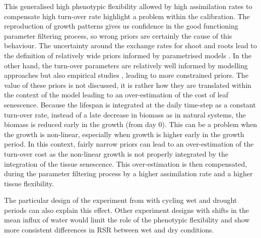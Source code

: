 This generalised high phenotypic flexibility allowed by high assimilation rates to compensate high turn-over rate highlight a problem within the calibration. The reproduction of growth patterns gives us confidence in the good functioning parameter filtering process, so wrong priors are certainly the cause of this behaviour. The uncertainty around the exchange rates for shoot and roots lead to the definition of relatively wide priors informed by parametrised models \parencite{kleidon_global_2000, reineking_environmental_2006, taubert_modelling_2014}. In the other hand, the turn-over parameters are relatively well informed by modelling approaches but also empirical studies \parencite{ ryser_ecological_2000, wright_worldwide_2004, tjoelker_linking_2005,  luke_mccormack_predicting_2012}, leading to more constrained priors. The value of these priors is not discussed, it is rather how they are translated within the context of the model leading to an over-estimation of the cost of leaf senescence. Because the lifespan is integrated at the daily time-step as a constant turn-over rate, instead of a late decrease in biomass as in natural systems, the biomass is reduced early in the growth (from day 0). This can be a problem when the growth is non-linear, especially when growth is higher early in the growth period. In this context, fairly narrow priors can lead to an over-estimation of the turn-over cost as the non-linear growth is not properly integrated by the integration of the tissue senescence. This over-estimation is then compensated, during the parameter filtering process by a higher assimilation rate and a higher tissue flexibility.

The particular design of the experiment from \cite{peterson_growth_1982} with cycling wet and drought periods can also explain this effect. Other experiment designs with shifts in the mean influx of water would limit the role of the phenotypic flexibility and show more consistent differences in RSR between wet and dry conditions.


